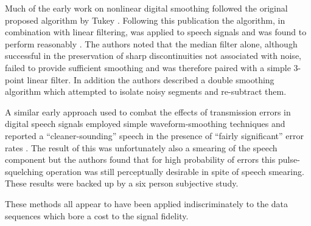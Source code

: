 Much of the early work on nonlinear digital smoothing followed the original proposed algorithm by Tukey \cite{Tukey1974}. Following this publication the algorithm, in combination with linear filtering, was applied to speech signals and was found to perform reasonably \cite{Rabiner1975}. The authors noted that the median filter alone, although successful in the preservation of sharp discontinuities not associated with noise, failed to provide sufficient smoothing and was therefore paired with a simple 3-point linear filter. In addition the authors described a double smoothing algorithm which attempted to isolate noisy segments and re-subtract them.


%
%
A similar early approach used to combat the effects of transmission errors in digital speech signals employed simple waveform-smoothing techniques and reported a ``cleaner-sounding'' speech in the presence of ``fairly significant'' error rates \cite{Jayant1976}. The result of this was unfortunately also a smearing of the speech component but the authors found that for high probability of errors this pulse-squelching operation was still perceptually desirable in spite of speech smearing. These results were backed up by a six person subjective study.

%
%

These methods all appear to have been applied indiscriminately to the data sequences which bore a cost to the signal fidelity.



